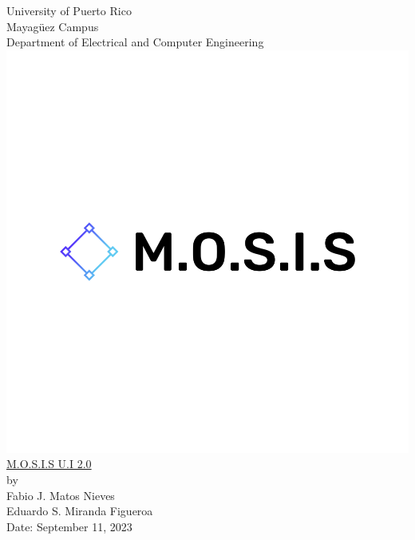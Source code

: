 \begin{titlepage}
  \begin{center}
    \large{University of Puerto Rico\\
    Mayagüez Campus\\
    \vspace{\baselineskip}
    Department of Electrical and Computer Engineering\\}
  \vspace{1.0cm}
  \includegraphics[scale=0.2]{../M.O.S.I.S Logo/default.png}
    \Huge{\underline{M.O.S.I.S U.I 2.0}\\}
    \vspace{1.5\baselineskip}
    \large by\\
    \vspace{\baselineskip}
    Fabio J. Matos Nieves\\
    Eduardo S. Miranda Figueroa\\
    \vspace{4.0cm}
    Date: September 11, 2023\\
    \normalsize

  \end{center}
\end{titlepage}
